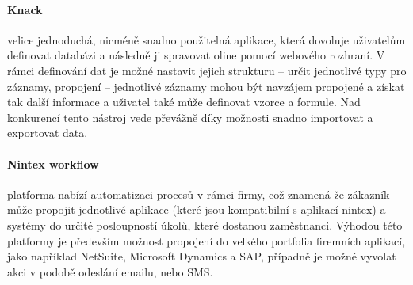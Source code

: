 \paragraph{Knack} velice jednoduchá, nicméně snadno použitelná aplikace, která dovoluje uživatelům definovat databázi a následně ji spravovat oline pomocí webového rozhraní. V rámci definování dat je možné nastavit jejich strukturu -- určit jednotlivé typy pro záznamy, propojení -- jednotlivé záznamy mohou být navzájem propojené a získat tak další informace a uživatel také může definovat vzorce a formule. Nad konkurencí tento nástroj vede převážně díky možnosti snadno importovat a exportovat data.

\paragraph{Nintex workflow} platforma nabízí automatizaci procesů v rámci firmy, což znamená že zákazník může propojit jednotlivé aplikace (které jsou kompatibilní s aplikací nintex) a systémy do určité posloupností úkolů, které dostanou zaměstnanci. Výhodou této platformy je především možnost propojení do velkého portfolia firemních aplikací, jako například NetSuite, Microsoft Dynamics a SAP, případně je možné vyvolat akci v podobě odeslání emailu, nebo SMS.
